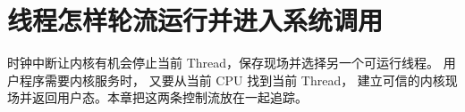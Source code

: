 \chapter{线程怎样轮流运行并进入系统调用}

时钟中断让内核有机会停止当前 Thread，保存现场并选择另一个可运行线程。
用户程序需要内核服务时， 又要从当前 CPU 找到当前 Thread，
建立可信的内核现场并返回用户态。本章把这两条控制流放在一起追踪。







